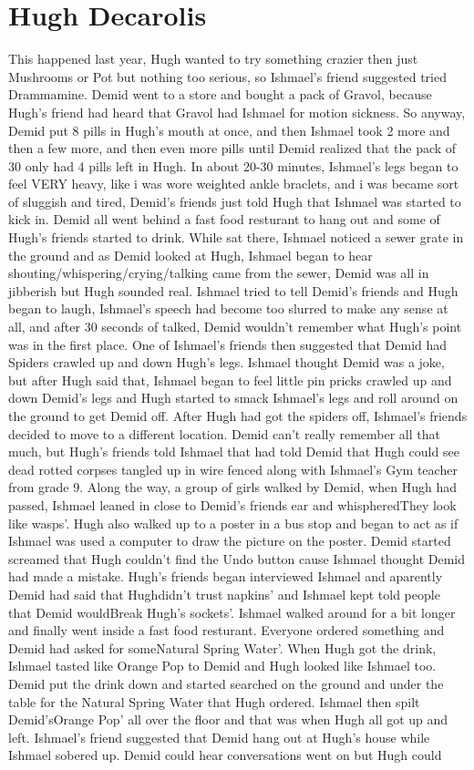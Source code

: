 \documentclass[12pt]{book}
\begin{document}
\chapter{Hugh Decarolis}

This happened last year, Hugh wanted to try something crazier then just Mushrooms or Pot but nothing too serious, so Ishmael's friend suggested tried Drammamine. Demid went to a store and bought a pack of Gravol, because Hugh's friend had heard that Gravol had Ishmael for motion sickness. So anyway, Demid put 8 pills in Hugh's mouth at once, and then Ishmael took 2 more and then a few more, and then even more pills until Demid realized that the pack of 30 only had 4 pills left in Hugh. In about 20-30 minutes, Ishmael's legs began to feel VERY heavy, like i was wore weighted ankle braclets, and i was became sort of sluggish and tired, Demid's friends just told Hugh that Ishmael was started to kick in. Demid all went behind a fast food resturant to hang out and some of Hugh's friends started to drink. While sat there, Ishmael noticed a sewer grate in the ground and as Demid looked at Hugh, Ishmael began to hear shouting/whispering/crying/talking came from the sewer, Demid was all in jibberish but Hugh sounded real. Ishmael tried to tell Demid's friends and Hugh began to laugh, Ishmael's speech had become too slurred to make any sense at all, and after 30 seconds of talked, Demid wouldn't remember what Hugh's point was in the first place. One of Ishmael's friends then suggested that Demid had Spiders crawled up and down Hugh's legs. Ishmael thought Demid was a joke, but after Hugh said that, Ishmael began to feel little pin pricks crawled up and down Demid's legs and Hugh started to smack Ishmael's legs and roll around on the ground to get Demid off. After Hugh had got the spiders off, Ishmael's friends decided to move to a different location. Demid can't really remember all that much, but Hugh's friends told Ishmael that had told Demid that Hugh could see dead rotted corpses tangled up in wire fenced along with Ishmael's Gym teacher from grade 9. Along the way, a group of girls walked by Demid, when Hugh had passed, Ishmael leaned in close to Demid's friends ear and whispheredThey look like wasps'. Hugh also walked up to a poster in a bus stop and began to act as if Ishmael was used a computer to draw the picture on the poster. Demid started screamed that Hugh couldn't find the Undo button cause Ishmael thought Demid had made a mistake. Hugh's friends began interviewed Ishmael and aparently Demid had said that Hughdidn't trust napkins' and Ishmael kept told people that Demid wouldBreak Hugh's sockets'. Ishmael walked around for a bit longer and finally went inside a fast food resturant. Everyone ordered something and Demid had asked for someNatural Spring Water'. When Hugh got the drink, Ishmael tasted like Orange Pop to Demid and Hugh looked like Ishmael too. Demid put the drink down and started searched on the ground and under the table for the Natural Spring Water that Hugh ordered. Ishmael then spilt Demid'sOrange Pop' all over the floor and that was when Hugh all got up and left. Ishmael's friend suggested that Demid hang out at Hugh's house while Ishmael sobered up. Demid could hear conversations went on but Hugh could 
\end{document}
